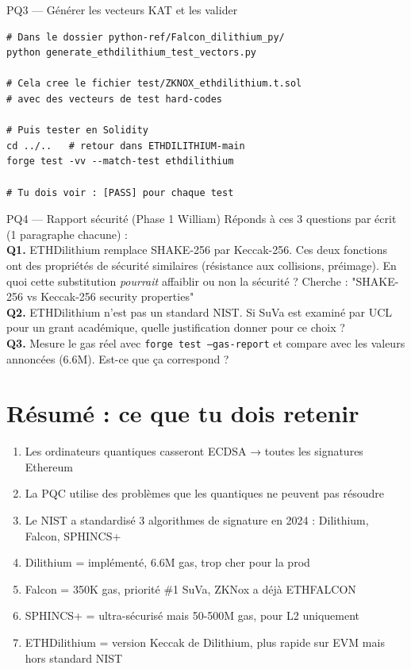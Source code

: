 \documentclass[12pt, a4paper]{article}
\begin{document}
\begin{pratique}{PQ3 --- Générer les vecteurs KAT et les valider}
\begin{lstlisting}[style=bash]
# Dans le dossier python-ref/Falcon_dilithium_py/
python generate_ethdilithium_test_vectors.py

# Cela cree le fichier test/ZKNOX_ethdilithium.t.sol
# avec des vecteurs de test hard-codes

# Puis tester en Solidity
cd ../..   # retour dans ETHDILITHIUM-main
forge test -vv --match-test ethdilithium

# Tu dois voir : [PASS] pour chaque test
\end{lstlisting}
\end{pratique}

\begin{pratique}{PQ4 --- Rapport sécurité (Phase 1 William)}
Réponds à ces 3 questions par écrit (1 paragraphe chacune) :\\[0.3cm]
\textbf{Q1.} ETHDilithium remplace SHAKE-256 par Keccak-256.
Ces deux fonctions ont des propriétés de sécurité similaires (résistance aux collisions,
préimage). En quoi cette substitution \textit{pourrait} affaiblir ou non la sécurité ?
Cherche : "SHAKE-256 vs Keccak-256 security properties"\\[0.2cm]
\textbf{Q2.} ETHDilithium n'est pas un standard NIST. Si SuVa est examiné par UCL
pour un grant académique, quelle justification donner pour ce choix ?\\[0.2cm]
\textbf{Q3.} Mesure le gas réel avec \texttt{forge test --gas-report} et compare
avec les valeurs annoncées (6.6M). Est-ce que ça correspond ?
\end{pratique}

\section*{Résumé : ce que tu dois retenir}

\begin{tcolorbox}[colback=suva_blue!5, colframe=suva_blue]
\begin{enumerate}
  \item Les ordinateurs quantiques casseront ECDSA → toutes les signatures Ethereum
  \item La PQC utilise des problèmes que les quantiques ne peuvent pas résoudre
  \item Le NIST a standardisé 3 algorithmes de signature en 2024 : Dilithium, Falcon, SPHINCS+
  \item Dilithium = implémenté, 6.6M gas, trop cher pour la prod
  \item Falcon = 350K gas, priorité \#1 SuVa, ZKNox a déjà ETHFALCON
  \item SPHINCS+ = ultra-sécurisé mais 50-500M gas, pour L2 uniquement
  \item ETHDilithium = version Keccak de Dilithium, plus rapide sur EVM mais hors standard NIST
\end{enumerate}
\end{tcolorbox}
\end{document}
